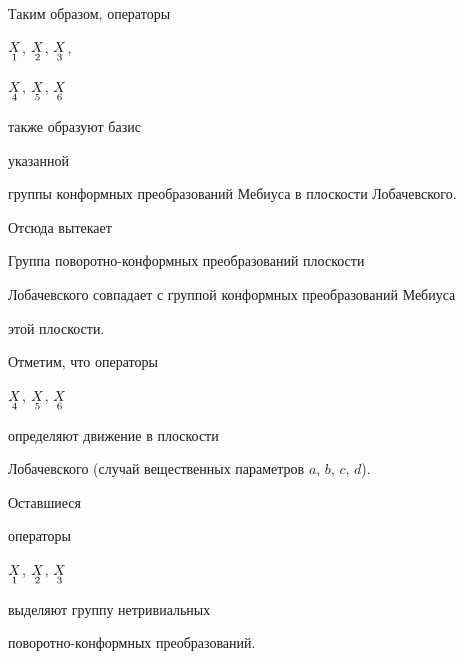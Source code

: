 Таким образом, операторы 


$\underset{1}{X}{}$, $\underset{2}{X}{}$, $\underset{3}{X}{}$, 


$\underset{4}{X}{}$, $\underset{5}{X}{}$, $\underset{6}{X}{}$ 


также образуют базис 


указанной 


группы конформных преобразований Мебиуса в плоскости Лобачевского. 


Отсюда вытекает 


 


\begin{thmnonum} 


Группа поворотно-конформных преобразований плоскости 


Лобачевского совпадает с группой конформных преобразований Мебиуса 


этой плоскости. 


\end{thmnonum} 


 


Отметим, что операторы 


$\underset{4}{X}{}$, $\underset{5}{X}{}$, $\underset{6}{X}{}$ 


определяют движение в плоскости 


Лобачевского (случай вещественных параметров $a$, $b$, $c$, $d$). 


Оставшиеся 


операторы 


$\underset{1}{X}{}$, $\underset{2}{X}{}$, $\underset{3}{X}{}$ 


выделяют группу нетривиальных 


поворотно-конформных преобразований. 


 


